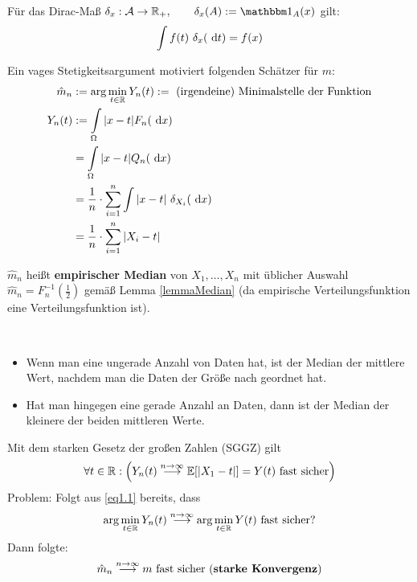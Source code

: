 \begin{erinnerung}
Für das Dirac-Maß $\delta_x:\A\to\R_+,\qquad\delta_x(A):=\indi_A(x)$ gilt:
\begin{align*}
\int\limits f(t)~\delta_x(\text{ d} t)=f(x)
\end{align*}
\end{erinnerung}

Ein vages Stetigkeitsargument motiviert folgenden Schätzer für $m$:
\begin{align*}
\hat{m}_n&:=\arg\min\limits_{t\in\mathbb{R}}Y_n(t):=\text{ (irgendeine) Minimalstelle der Funktion}\\
Y_n(t)&:=\int\limits_\Omega |x-t|F_n(\text{ d} x)\\ 
&=\int\limits_\Omega |x-t|Q_n(\text{ d} x)\\ 
&=\frac{1}{n}\cdot\sum\limits_{i=1}^n\int\limits|x-t|~\delta_{X_i}(\text{ d} x)\\
&=\frac{1}{n}\cdot\sum\limits_{i=1}^n|X_i-t|
\end{align*} 

$\hat{m}_n$ heißt \textbf{empirischer Median} von $X_1,\ldots,X_n$ mit üblicher Auswahl $\hat{m}_n=F_n^{-1}\left(\frac{1}{2}\right)$ gemäß Lemma \ref{lemmaMedian} (da empirische Verteilungsfunktion eine Verteilungsfunktion ist).


\begin{bemerkung}\
\begin{itemize}
\item Wenn man eine ungerade Anzahl von Daten hat, ist der Median der mittlere Wert, nachdem man die Daten der Größe nach geordnet hat.
\item Hat man hingegen eine gerade Anzahl an Daten, dann ist der Median der kleinere der beiden mittleren Werte.
\end{itemize}
\end{bemerkung}

Mit dem starken Gesetz der großen Zahlen (SGGZ) gilt
\begin{align}\label{eq1.1}
\forall t\in\mathbb{R}: \Big(Y_n(t)\stackrel{n\to\infty}{\longrightarrow}
\mathbb{E}[|X_1-t|]=Y(t)\text{ fast sicher}\Big)
\end{align}
Problem: Folgt aus \eqref{eq1.1} bereits, dass
\begin{align*}
\arg\min\limits_{t\in\mathbb{R}} Y_n(t)
\stackrel{n\to\infty}{\longrightarrow}
\arg\min\limits_{t\in\mathbb{R}}
Y(t)\text{ fast sicher?}
\end{align*}
Dann folgte:
\begin{align*}
\hat{m}_n
\stackrel{n\to\infty}{\longrightarrow}
m\text{ fast sicher (\textbf{starke Konvergenz})}
\end{align*}

